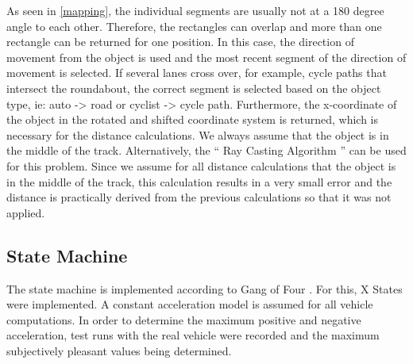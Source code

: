 \documentclass[11pt,oneside,openright]{mpreport}
\begin{document}
As seen in \cref{mapping}, the individual segments are usually not at a 180 degree angle to each other. Therefore, the rectangles can overlap and more than one rectangle can 
be returned for one position. In this case, the direction of movement from the object is used and the most recent segment of the direction of movement is selected.
If several lanes cross over, for example, cycle paths that intersect the roundabout, the correct segment is selected based on the object type, ie: auto -> road or cyclist -> cycle path.
Furthermore, the x-coordinate of the object in the rotated and shifted coordinate system is returned, which is necessary for the distance calculations. We always assume that the
object is in the middle of the track. Alternatively, the `` Ray Casting Algorithm '' \cite{Galetzka2017} can be used for this problem. Since we assume for all
distance calculations that the object is in the middle of the track, this calculation results in a very small error and the distance is practically derived from the
previous calculations so that it was not applied.

\subsection{State Machine} 
The state machine is implemented according to Gang of Four \cite{lester2008gang}. For this, X States were implemented. 
A constant acceleration model is assumed for all vehicle computations. In order to determine the maximum positive and negative acceleration, 
test runs with the real vehicle  were recorded and the maximum subjectively pleasant values being determined. 
\end{document}
